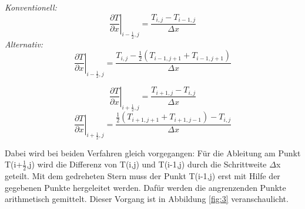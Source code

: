 \documentclass[twoside,10pt,a4paper]{article}
\numberwithin{equation}{section}					%
\numberwithin{figure}{section}						%
\begin{document}
\begin{multicols}{2}
\textit{Konventionell:}\\
\begin{equation}
    \left.\frac{\partial T}{\partial x}\right|_{i-\frac{1}{2},j}=\frac{T_{i,j}-T_{i-1,j}}{\Delta x}
\end{equation}
\textit{Alternativ:}\\
\begin{equation}
    \left.\frac{\partial T}{\partial x}\right|_{i-\frac{1}{2},j}=\frac{T_{i,j}-\frac{1}{2}(T_{i-1,j+1}+T_{i-1,j+1})}{\Delta x}
\end{equation}
\end{multicols}

\begin{multicols}{2}
\begin{equation}
    \left.\frac{\partial T}{\partial x}\right|_{i+\frac{1}{2},j}=\frac{T_{i+1,j}-T_{i,j}}{\Delta x}
\end{equation}
\begin{equation}
    \left.\frac{\partial T}{\partial x}\right|_{i+\frac{1}{2},j}=\frac{\frac{1}{2}(T_{i+1,j+1}+T_{i+1,j-1})-T_{i,j}}{\Delta x}
\end{equation}
\end{multicols}
Dabei wird bei beiden Verfahren gleich vorgegangen: Für die Ableitung am Punkt T(i+$\frac{1}{2}$,j) wird die Differenz von T(i,j) und T(i-1,j) durch die Schrittweite $\Delta$x geteilt. Mit dem gedreheten Stern muss der Punkt T(i-1,j) erst mit Hilfe der gegebenen Punkte hergeleitet werden. Dafür werden die angrenzenden Punkte arithmetisch gemittelt. Dieser Vorgang ist in Abbildung \ref{fig:3} veranschaulicht.
\end{document}
